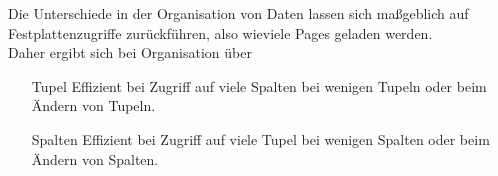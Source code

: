 \documentclass{uni_tue_template}
\begin{document}
		\newpage
	\item Die Unterschiede in der Organisation von Daten lassen sich maßgeblich auf Festplattenzugriffe zurückführen, also wieviele Pages geladen werden.\\
	Daher ergibt sich bei Organisation über\\
		\begin{enumerate}
			\item[Tupel] Effizient bei Zugriff auf viele Spalten bei wenigen Tupeln oder beim Ändern von Tupeln.
			\item[Spalten] Effizient bei Zugriff auf viele Tupel bei wenigen Spalten oder beim Ändern von Spalten.
		\end{enumerate}
\subExEnd
\end{document}
